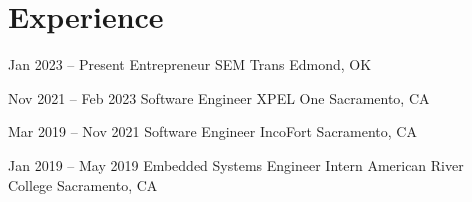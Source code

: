 \section{Experience}

\cventry
    {Jan 2023 -- Present}
    {Entrepreneur}
    {SEM Trans}
    {Edmond, OK}
    {}
    {}

\cventry
    {Nov 2021 -- Feb 2023}
    {Software Engineer}
    {XPEL One}
    {Sacramento, CA}
    {}
    {}

\cventry
    {Mar 2019 -- Nov 2021}
    {Software Engineer}
    {IncoFort}
    {Sacramento, CA}
    {}
    {}

\cventry
    {Jan 2019 -- May 2019}
    {Embedded Systems Engineer Intern}
    {American River College}
    {Sacramento, CA}
    {}
    {}
